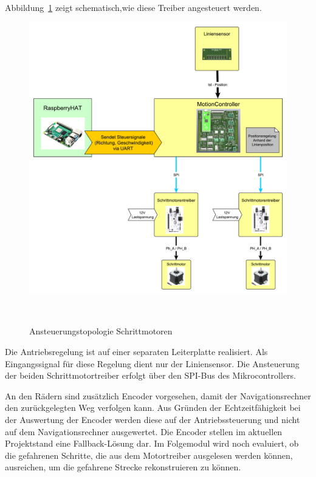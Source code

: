 \documentclass[main.tex]{subfiles} %
\begin{document}
Abbildung~\ref{Ansteuerungstopologie_Schrittmotorentreiber} zeigt
schematisch,wie diese Treiber angesteuert werden.

\begin{figure}[H]
    \centering
    \includegraphics[width = 1\linewidth]{fig_Antriebe_und_Dimensionierung/Konzept_Motoransteuerung.pdf}
    \caption{Ansteuerungstopologie Schrittmotoren}~\label{Ansteuerungstopologie_Schrittmotorentreiber}
\end{figure}

Die Antriebsregelung ist auf einer separaten Leiterplatte realisiert. Als
Eingangssignal für diese Regelung dient nur der Liniensensor. Die Ansteuerung
der beiden Schrittmotortreiber erfolgt über den SPI-Bus des Mikrocontrollers.

An den Rädern sind zusätzlich Encoder vorgesehen, damit der Navigationsrechner
den zurückgelegten Weg verfolgen kann. Aus Gründen der Echtzeitfähigkeit bei
der Auswertung der Encoder werden diese auf der Antriebssteuerung und nicht auf
dem Navigationsrechner ausgewertet. Die Encoder stellen im aktuellen
Projektstand eine Fallback-Lösung dar. Im Folgemodul wird noch evaluiert, ob
die gefahrenen Schritte, die aus dem Motortreiber ausgelesen werden können,
ausreichen, um die gefahrene Strecke rekonstruieren zu können.
\end{document}
